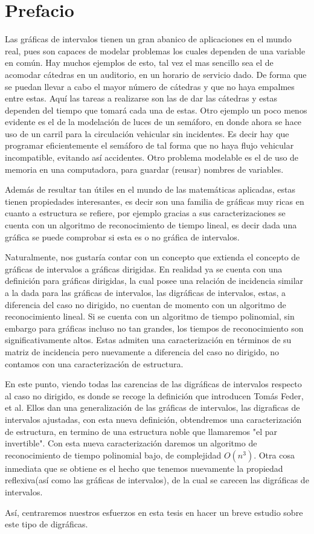 \chapter*{Prefacio}
\label{sec:prfcio}

Las gráficas de intervalos tienen un gran abanico de aplicaciones en el mundo real, pues son capaces de modelar problemas los cuales dependen de una variable en común. Hay muchos ejemplos de esto, tal vez el mas sencillo sea el de acomodar cátedras en un auditorio, en un horario de servicio dado. De forma que se puedan llevar a cabo el mayor número de cátedras y que no haya empalmes entre estas. Aquí las tareas a realizarse son las de dar las cátedras y estas dependen del tiempo que tomará cada una de estas. Otro ejemplo un poco menos evidente es el de la modelación de luces de un semáforo, en donde ahora se hace uso de un carril para la circulación vehicular sin incidentes. Es decir hay que programar eficientemente el semáforo de tal forma que no haya flujo vehicular incompatible, evitando así accidentes. Otro problema modelable es el de uso de memoria en una computadora, para guardar (reusar) nombres de variables.

Además de resultar tan útiles en el mundo de las matemáticas aplicadas, estas tienen propiedades interesantes, es decir son una familia de gráficas muy ricas en cuanto a estructura se refiere, por ejemplo gracias a sus caracterizaciones se cuenta con un algoritmo de reconocimiento de tiempo lineal, es decir dada una gráfica se puede comprobar si esta es o no gráfica de intervalos. 

Naturalmente, nos gustaría contar con un concepto que extienda el concepto de gráficas de intervalos a gráficas dirigidas. 
En realidad ya se cuenta con una definición para gráficas dirigidas, la cual posee una relación de incidencia similar a la dada para las gráficas de intervalos, las digráficas de intervalos, estas, a diferencia del caso no dirigido, no cuentan de momento con un algoritmo de reconocimiento lineal. Si se cuenta con un algoritmo de tiempo polinomial, sin embargo para gráficas incluso no tan grandes, los tiempos de reconocimiento son significativamente altos. 
Estas admiten una caracterización en términos de su matriz de incidencia pero nuevamente a diferencia del caso no dirigido, no contamos con una caracterización de estructura.

En este punto, viendo todas las carencias de las digráficas de intervalos respecto al caso no dirigido, es donde se recoge la definición que introducen Tomás Feder, et al. Ellos dan una generalización de las gráficas de intervalos, las digraficas de intervalos ajustadas, con esta nueva definición, obtendremos una caracterización de estructura, en termino de una estructura noble que llamaremos "el par invertible". Con esta nueva caracterización daremos un algoritmo de reconocimiento de tiempo polinomial bajo, de complejidad $O(n^3)$. Otra cosa inmediata que se obtiene es el hecho que tenemos nuevamente la propiedad reflexiva(así como las gráficas de intervalos), de la cual se carecen las digráficas de intervalos.

Así, centraremos nuestros esfuerzos en esta tesis en hacer un breve estudio sobre este tipo de digráficas.